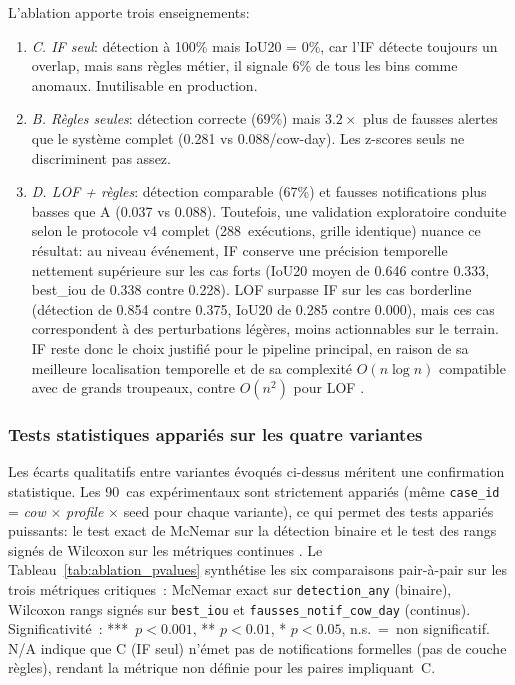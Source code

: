 L'ablation apporte trois enseignements:
\begin{enumerate}
    \item \textit{C. IF seul}: détection à 100\% mais IoU20 = 0\%, car l'IF détecte toujours
    un overlap, mais sans règles métier, il signale 6\% de tous les bins comme anomaux.
    Inutilisable en production.
    \item \textit{B. Règles seules}: détection correcte (69\%) mais $3.2\times$ plus de
    fausses alertes que le système complet (0.281 vs 0.088/cow-day). Les z-scores seuls ne
    discriminent pas assez.
    \item \textit{D. LOF + règles}: détection comparable (67\%) et fausses notifications
    plus basses que A (0.037 vs 0.088). Toutefois, une validation exploratoire conduite
    selon le protocole v4 complet (288~exécutions, grille identique) nuance ce résultat: au
    niveau événement, IF conserve une précision temporelle nettement supérieure sur les
    cas forts (IoU20 moyen de 0.646 contre 0.333, best\_iou de 0.338 contre 0.228). LOF
    surpasse IF sur les cas borderline (détection de 0.854 contre 0.375, IoU20 de 0.285
    contre 0.000), mais ces cas correspondent à des perturbations légères, moins
    actionnables sur le terrain. IF reste donc le choix justifié pour le pipeline
    principal, en raison de sa meilleure localisation temporelle \citep{liu2008isolation} et
    de sa complexité $O(n \log n)$ compatible avec de grands troupeaux, contre $O(n^2)$ pour
    LOF \citep{breunig2000lof}.
\end{enumerate}

\subsubsection{Tests statistiques appariés sur les quatre variantes}

Les écarts qualitatifs entre variantes évoqués ci-dessus méritent une confirmation
statistique. Les 90~cas expérimentaux sont strictement appariés (même
\texttt{case\_id} = \textit{cow} $\times$ \textit{profile} $\times$ seed
pour chaque variante), ce qui permet des tests appariés puissants: le test
exact de McNemar sur la détection binaire \citep{mcnemar1947note} et le test
des rangs signés de Wilcoxon sur les métriques continues
\citep{wilcoxon1945individual}. Le Tableau~\ref{tab:ablation_pvalues} synthétise
les six comparaisons pair-à-pair sur les trois métriques critiques~: McNemar exact sur
\texttt{detection\_any} (binaire), Wilcoxon rangs signés sur \texttt{best\_iou} et
\texttt{fausses\_notif\_cow\_day} (continus). Significativité~:
\mbox{*** $p<0.001$}, ** $p<0.01$, * $p<0.05$, n.s.~=~non significatif. N/A indique
que C (IF seul) n'émet pas de notifications formelles (pas de couche règles), rendant
la métrique non définie pour les paires impliquant~C.

